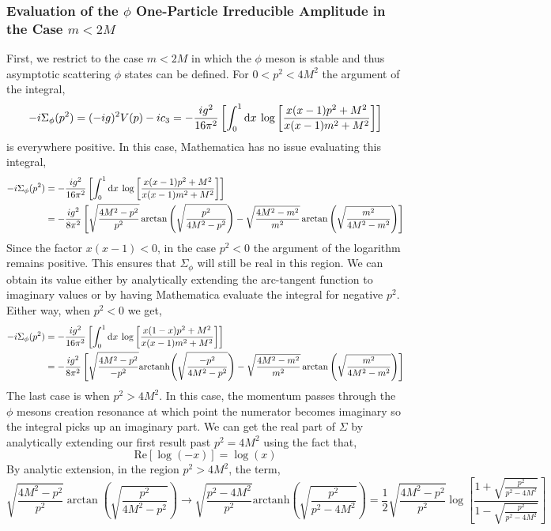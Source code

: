 \documentclass{article}
\begin{document}
\subsubsection{Evaluation of the $\phi$ One-Particle Irreducible Amplitude in the Case $m < 2 M$}

First, we restrict to the case $m < 2 M$ in which the $\phi$ meson is stable and thus asymptotic scattering $\phi$ states can be defined. For $0 < p^2 < 4 M^2$ the argument of the integral,
\[ - i \Sigma_\phi(p^2) = (-ig)^2 V(p) - i c_3 = - \frac{ig^2}{16 \pi^2} \left[ \int_{0}^{1} \mathrm{d}x \: \log{\left[\frac{x(x - 1) p^2 + M^2}{x(x - 1) m^2 + M^2} \right]} \right] \]
is everywhere positive. In this case, Mathematica has no issue evaluating this integral, 
\begin{align*}
- i \Sigma_\phi(p^2) &= - \frac{ig^2}{16 \pi^2} \left[ \int_{0}^{1} \mathrm{d}x \: \log{\left[\frac{x(x - 1) p^2 + M^2}{x(x - 1) m^2 + M^2} \right]} \right] 
\\
& = - \frac{ig^2}{8 \pi^2} \left[ \sqrt{\frac{4 M^2 - p^2}{p^2}} \arctan{\left( \sqrt{\frac{p^2}{4 M^2 - p^2}} \right)} - \sqrt{\frac{4 M^2 - m^2}{m^2}} \arctan{\left( \sqrt{\frac{m^2}{4 M^2 - m^2}}\right)}\right]
\end{align*}
Since the factor $x(x-1) < 0$, in the case $p^2 < 0$ the argument of the logarithm remains positive. This ensures that $\Sigma_\phi$ will still be real in this region. We can obtain its value either by analytically extending the arc-tangent function to imaginary values or by having Mathematica evaluate the integral for negative $p^2$. Either way, when $p^2 < 0$ we get,
\begin{align*}
- i \Sigma_\phi(p^2) &= - \frac{ig^2}{16 \pi^2} \left[ \int_{0}^{1} \mathrm{d}x \: \log{\left[\frac{x(1 - x) p^2 + M^2}{x(x - 1) m^2 + M^2} \right]} \right] 
\\
& = - \frac{ig^2}{8 \pi^2} \left[ \sqrt{\frac{4 M^2 - p^2}{-p^2}} \mathrm{arctanh}{\left(\sqrt{\frac{-p^2}{4 M^2 - p^2}}\right)} - \sqrt{\frac{4 M^2 - m^2}{m^2}} \arctan{\left(\sqrt{\frac{m^2}{4 M^2 - m^2}}\right)}\right]
\end{align*}
The last case is when $p^2 > 4 M^2$. In this case, the momentum passes through the $\phi$ mesons creation resonance at which point the numerator becomes imaginary so the integral picks up an imaginary part. We can get the real part of $\Sigma$ by analytically extending our first result past $p^2 = 4 M^2$ using the fact that,
\[ \mathrm{Re}[\log{(-x)}] = \log{(x)} \]
By analytic extension, in the region $p^2  > 4 M^2$, the term,
\[\sqrt{\frac{4 M^2 - p^2}{p^2}} \arctan{\left(\sqrt{\frac{p^2}{4 M^2 - p^2}}\right)} \to \sqrt{\frac{p^2 - 4 M^2}{p^2}} \mathrm{arctanh}{\left(\sqrt{\frac{p^2}{p^2 - 4 M^2}}\right)} = \frac{1}{2} \sqrt{\frac{4 M^2 - p^2}{p^2}} \log{\left[ \frac{1 + \sqrt{\frac{p^2}{p^2 - 4 M^2}}}{1 - \sqrt{\frac{p^2}{p^2 - 4 M^2}}} \right]}\]
\end{document}
